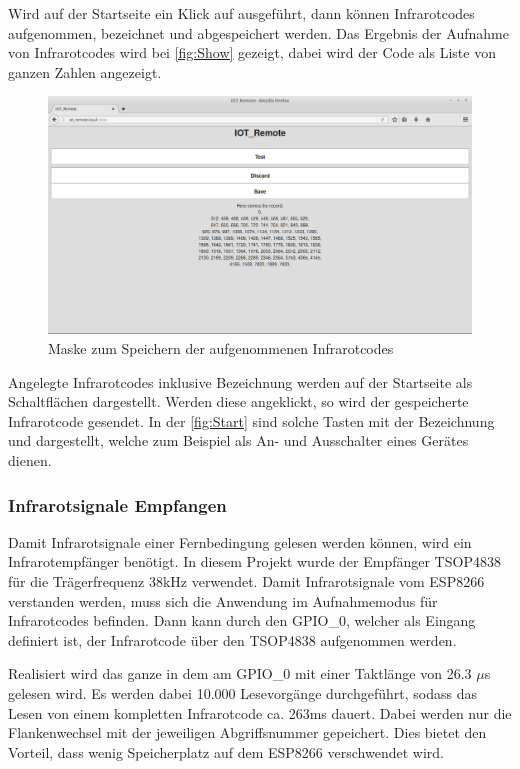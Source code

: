 Wird auf der Startseite ein Klick auf  ausgeführt, dann können Infrarotcodes aufgenommen, bezeichnet und abgespeichert werden.
Das Ergebnis der Aufnahme von Infrarotcodes wird bei \autoref{fig:Show} gezeigt, dabei wird der Code als Liste von ganzen Zahlen angezeigt. 
\begin{figure}[!ht]
	\centering
	\includegraphics[scale=0.3]{Abbildungen/Show}
	\caption{Maske zum Speichern der aufgenommenen Infrarotcodes}
	\label{fig:Show}
\end{figure}
Angelegte Infrarotcodes inklusive Bezeichnung werden auf der Startseite als Schaltflächen dargestellt.
Werden diese angeklickt, so wird der gespeicherte Infrarotcode gesendet.
In der \autoref{fig:Start} sind solche Tasten mit der Bezeichnung  und  dargestellt, welche zum Beispiel als An- und Ausschalter eines Gerätes dienen.

\subsubsection{Infrarotsignale Empfangen}
Damit Infrarotsignale einer Fernbedingung gelesen werden können, wird ein Infrarotempfänger benötigt.
In diesem Projekt wurde der Empfänger TSOP4838 für die Trägerfrequenz 38kHz verwendet.
Damit Infrarotsignale vom ESP8266 verstanden werden, muss sich die Anwendung im Aufnahmemodus für Infrarotcodes befinden.
Dann kann durch den \acs{GPIO}\_0, welcher als Eingang definiert ist, der Infrarotcode über den TSOP4838 aufgenommen werden.

Realisiert wird das ganze in dem am \acs{GPIO}\_0 mit einer Taktlänge von 26.3 $\mu$s gelesen wird.
Es werden dabei 10.000 Lesevorgänge durchgeführt, sodass das Lesen von einem kompletten Infrarotcode ca. 263ms dauert.
Dabei werden nur die Flankenwechsel mit der jeweiligen Abgriffsnummer gepeichert.
Dies bietet den Vorteil, dass wenig Speicherplatz auf dem ESP8266 verschwendet wird.

